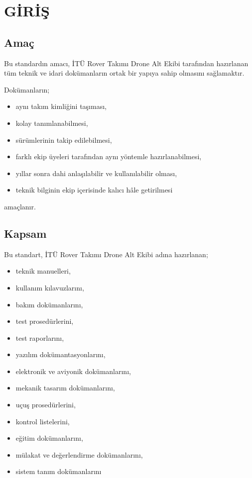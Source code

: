 \documentclass[11pt,a4paper]{article}
\begin{document}
\tableofcontents

\newpage


\section{GİRİŞ}

\subsection{Amaç}

Bu standardın amacı, İTÜ Rover Takımı Drone Alt Ekibi tarafından
hazırlanan tüm teknik ve idari dokümanların ortak bir yapıya sahip
olmasını sağlamaktır.

Dokümanların;

\begin{itemize}
    \item aynı takım kimliğini taşıması,
    \item kolay tanımlanabilmesi,
    \item sürümlerinin takip edilebilmesi,
    \item farklı ekip üyeleri tarafından aynı yöntemle hazırlanabilmesi,
    \item yıllar sonra dahi anlaşılabilir ve kullanılabilir olması,
    \item teknik bilginin ekip içerisinde kalıcı hâle getirilmesi
\end{itemize}

amaçlanır.

\subsection{Kapsam}

Bu standart, İTÜ Rover Takımı Drone Alt Ekibi adına hazırlanan;

\begin{itemize}
    \item teknik manuelleri,
    \item kullanım kılavuzlarını,
    \item bakım dokümanlarını,
    \item test prosedürlerini,
    \item test raporlarını,
    \item yazılım dokümantasyonlarını,
    \item elektronik ve aviyonik dokümanlarını,
    \item mekanik tasarım dokümanlarını,
    \item uçuş prosedürlerini,
    \item kontrol listelerini,
    \item eğitim dokümanlarını,
    \item mülakat ve değerlendirme dokümanlarını,
    \item sistem tanım dokümanlarını
\end{itemize}
\end{document}
